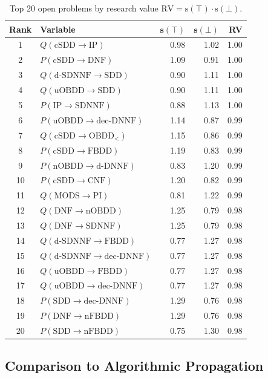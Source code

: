 \documentclass[10pt]{article}
\theoremstyle{plain}
\theoremstyle{definition}
\theoremstyle{remark}
\begin{document}
\begin{table}[ht]
\centering
\small
\caption{Top 20 open problems by research value $\text{RV} = \text{s}(\top) \cdot \text{s}(\bot)$.}
\label{tab:rv}
\begin{tabular}{clrrr}
\textbf{Rank} & \textbf{Variable} & $\mathbf{s(\top)}$ & $\mathbf{s(\bot)}$ & \textbf{RV} \\ \hline
1 & $Q(\text{cSDD} \to \text{IP})$ & 0.98 & 1.02 & 1.00 \\
2 & $P(\text{cSDD} \to \text{DNF})$ & 1.09 & 0.91 & 1.00 \\
3 & $Q(\text{d-SDNNF} \to \text{SDD})$ & 0.90 & 1.11 & 1.00 \\
4 & $Q(\text{uOBDD} \to \text{SDD})$ & 0.90 & 1.11 & 1.00 \\
5 & $P(\text{IP} \to \text{SDNNF})$ & 0.88 & 1.13 & 1.00 \\
6 & $P(\text{uOBDD} \to \text{dec-DNNF})$ & 1.14 & 0.87 & 0.99 \\
7 & $Q(\text{cSDD} \to \text{OBDD}_<)$ & 1.15 & 0.86 & 0.99 \\
8 & $P(\text{cSDD} \to \text{FBDD})$ & 1.19 & 0.83 & 0.99 \\
9 & $P(\text{nOBDD} \to \text{d-DNNF})$ & 0.83 & 1.20 & 0.99 \\
10 & $P(\text{cSDD} \to \text{CNF})$ & 1.20 & 0.82 & 0.99 \\
11 & $Q(\text{MODS} \to \text{PI})$ & 0.81 & 1.22 & 0.99 \\
12 & $Q(\text{DNF} \to \text{nOBDD})$ & 1.25 & 0.79 & 0.98 \\
13 & $Q(\text{DNF} \to \text{SDNNF})$ & 1.25 & 0.79 & 0.98 \\
14 & $Q(\text{d-SDNNF} \to \text{FBDD})$ & 0.77 & 1.27 & 0.98 \\
15 & $Q(\text{d-SDNNF} \to \text{dec-DNNF})$ & 0.77 & 1.27 & 0.98 \\
16 & $Q(\text{uOBDD} \to \text{FBDD})$ & 0.77 & 1.27 & 0.98 \\
17 & $Q(\text{uOBDD} \to \text{dec-DNNF})$ & 0.77 & 1.27 & 0.98 \\
18 & $P(\text{SDD} \to \text{dec-DNNF})$ & 1.29 & 0.76 & 0.98 \\
19 & $P(\text{DNF} \to \text{nFBDD})$ & 1.29 & 0.76 & 0.98 \\
20 & $P(\text{SDD} \to \text{nFBDD})$ & 0.75 & 1.30 & 0.98 \\
\end{tabular}
\end{table}

\subsection{Comparison to Algorithmic Propagation}
\end{document}

